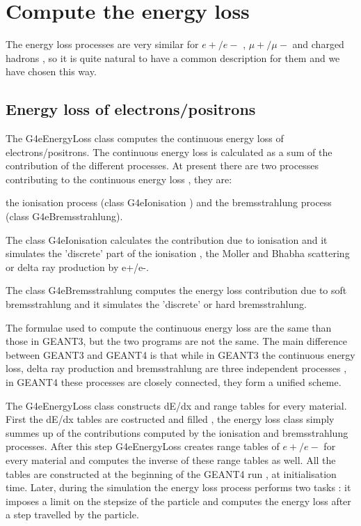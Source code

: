 \chapter{Compute the energy loss}
 
 The energy loss processes are very similar for \(e+/e-\) , \(\mu+/\mu-\) and
charged hadrons , so it is quite natural to have a common description for them
and we have chosen this way.

\section{Energy loss of electrons/positrons}

 The G4eEnergyLoss class computes the continuous energy loss \linebreak
  of electrons/positrons.
 The continuous energy loss is calculated as
a sum of the contribution of the different processes.
 At present there are two processes
contributing to the continuous energy loss , they are:

            the ionisation process (class G4eIonisation ) and
            the bremsstrahlung process (class G4eBremsstrahlung).

 The class G4eIonisation calculates the contribution due to ionisation and
it simulates the 'discrete' part of the ionisation , the Moller and Bhabha
scattering or delta ray production by e+/e-.

 The class G4eBremsstrahlung computes the energy loss contribution due to
soft bremsstrahlung and it simulates the 'discrete' or hard bremsstrahlung.
 
 The formulae used to compute the continuous energy loss are the same than
those in GEANT3, but the two programs are not the same. 
 The main difference between GEANT3 and GEANT4 is that while in GEANT3 the
continuous energy loss, delta ray production and bremsstrahlung are three
independent processes , in GEANT4 these processes are closely connected,
they form a unified scheme.

 The G4eEnergyLoss class constructs dE/dx and range tables for every material.
 First the dE/dx tables are costructed and filled , the energy loss class
  simply summes up of the contributions computed by the ionisation and 
 bremsstrahlung processes. After this step G4eEnergyLoss creates range tables
 of \(e+/e-\) for every material and computes the inverse of these range 
 tables as well. All the tables are constructed 
 at the beginning of the GEANT4 run , at initialisation time. Later, during
the simulation the energy loss process performs two tasks : it imposes a
limit on the stepsize of the particle and computes the energy loss after
a step travelled by the particle. 
 
